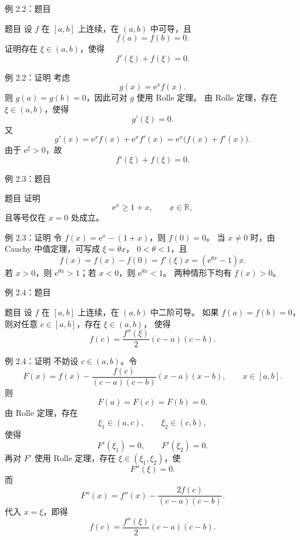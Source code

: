\documentclass[aspectratio=169,10pt]{ctexbeamer}
\newcommand{\R}{\mathbb{R}}
\newcommand{\ee}{\mathrm{e}}
\begin{document}
\begin{frame}{例 2.2：题目}
\small
\begin{block}{题目}
设 $f$ 在 $[a,b]$ 上连续，在 $(a,b)$ 中可导，且
\[
  f(a)=f(b)=0.
\]
证明存在 $\xi\in(a,b)$，使得
\[
  f'(\xi)+f(\xi)=0.
\]
\end{block}
\end{frame}

\begin{frame}{例 2.2：证明}
\small
考虑
\[
  g(x)=\ee^x f(x).
\]
则 $g(a)=g(b)=0$，因此可对 $g$ 使用 Rolle 定理。
由 Rolle 定理，存在 $\xi\in(a,b)$，使得
\[
  g'(\xi)=0.
\]
又
\[
  g'(x)=\ee^x f(x)+\ee^x f'(x)
       =\ee^x\bigl(f(x)+f'(x)\bigr).
\]
由于 $\ee^\xi>0$，故
\[
  f'(\xi)+f(\xi)=0.
\]
\end{frame}

\begin{frame}{例 2.3：题目}
\small
\begin{block}{题目}
证明
\[
  \ee^x\ge1+x,\qquad x\in\R,
\]
且等号仅在 $x=0$ 处成立。
\end{block}
\end{frame}

\begin{frame}{例 2.3：证明}
\small
令 $f(x)=\ee^x-(1+x)$，则 $f(0)=0$。
当 $x\ne0$ 时，由 Cauchy 中值定理，可写成 $\xi=\theta x$，
$0<\theta<1$，且
\[
  f(x)=f(x)-f(0)=f'(\xi)x=(\ee^{\theta x}-1)x.
\]
若 $x>0$，则 $\ee^{\theta x}>1$；若 $x<0$，则 $\ee^{\theta x}<1$。
两种情形下均有 $f(x)>0$。
\end{frame}

\begin{frame}{例 2.4：题目}
\small
\begin{block}{题目}
设 $f$ 在 $[a,b]$ 上连续，在 $(a,b)$ 中二阶可导。
如果 $f(a)=f(b)=0$，则对任意 $c\in[a,b]$，存在 $\xi\in(a,b)$，
使得
\[
  f(c)=\frac{f''(\xi)}2(c-a)(c-b).
\]
\end{block}
\end{frame}

\begin{frame}{例 2.4：证明}
\small
不妨设 $c\in(a,b)$。令
\[
  F(x)=f(x)-\frac{f(c)}{(c-a)(c-b)}(x-a)(x-b),
  \qquad x\in[a,b].
\]
则
\[
  F(a)=F(c)=F(b)=0.
\]
由 Rolle 定理，存在
\[
  \xi_1\in(a,c),\qquad \xi_2\in(c,b),
\]
使得
\[
  F'(\xi_1)=0,\qquad F'(\xi_2)=0.
\]
再对 $F'$ 使用 Rolle 定理，存在 $\xi\in(\xi_1,\xi_2)$，使
\[
  F''(\xi)=0.
\]
而
\[
  F''(x)=f''(x)-\frac{2f(c)}{(c-a)(c-b)}.
\]
代入 $x=\xi$，即得
\[
  f(c)=\frac{f''(\xi)}2(c-a)(c-b).
\]
\end{frame}
\end{document}
